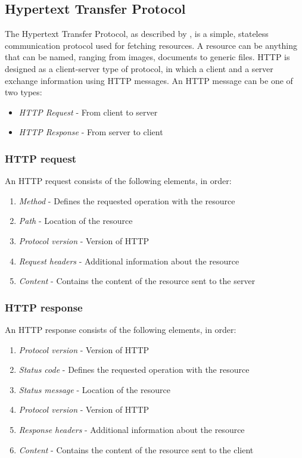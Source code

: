 \subsection{Hypertext Transfer Protocol}
The Hypertext Transfer Protocol, as described by \cite{MozillaHTTP}, is a simple, stateless communication protocol used for fetching resources. A resource can be anything that can be named, ranging from images, documents to generic files. HTTP is designed as a client-server type of protocol, in which a client and a server exchange information using HTTP messages. An HTTP message can be one of two types:
\begin{itemize}
    \item \textit{HTTP Request} - From client to server
    \item \textit{HTTP Response} - From server to client
\end{itemize}
\subsubsection{HTTP request}
An HTTP request consists of the following elements, in order:
\begin{enumerate}
    \item \textit{Method} - Defines the requested operation with the resource
    \item \textit{Path} - Location of the resource
    \item \textit{Protocol version} - Version of HTTP
    \item \textit{Request headers} - Additional information about the resource
    \item \textit{Content} - Contains the content of the resource sent to the server
\end{enumerate}
\subsubsection{HTTP response}
An HTTP response consists of the following elements, in order:
\begin{enumerate}
    \item \textit{Protocol version} - Version of HTTP
    \item \textit{Status code} - Defines the requested operation with the resource
    \item \textit{Status message} - Location of the resource
    \item \textit{Protocol version} - Version of HTTP
    \item \textit{Response headers} - Additional information about the resource
    \item \textit{Content} - Contains the content of the resource sent to the client
    \end{enumerate}
